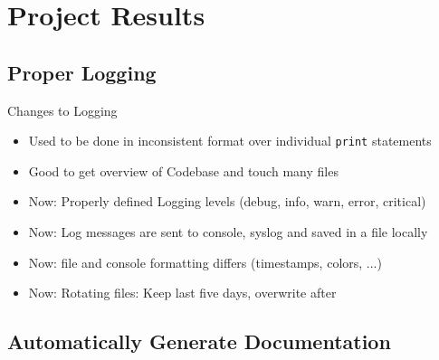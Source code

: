 \section{Project Results}

% 

\subsection{Proper Logging}

\begin{frame}[c]{Changes to Logging}
    \large
    \begin{itemize}[<+(1)->]
        \item Used to be done in inconsistent format over individual \texttt{print} statements
        \item Good to get overview of Codebase and touch many files
        \item Now: Properly defined Logging levels (debug, info, warn, error, critical)
        \item Now: Log messages are sent to console, syslog and saved in a file locally
        \item Now: file and console formatting differs (timestamps, colors, ...)
        \item Now: Rotating files: Keep last five days, overwrite after
    \end{itemize}
\end{frame}



\subsection{Automatically Generate Documentation}

